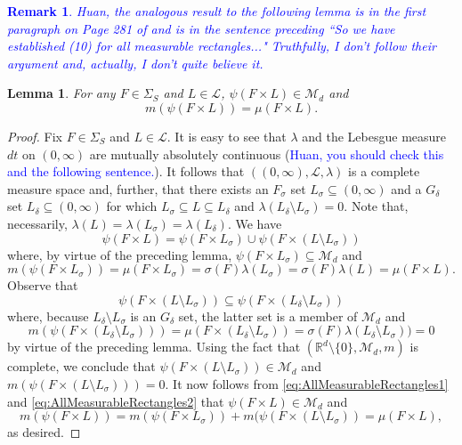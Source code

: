 \documentclass[11pt]{article}
\theoremstyle{theorem}
\newtheorem{lemma}[theorem]{Lemma}
\newtheorem{remark}{Remark}
\begin{document}
\textcolor{blue}{\begin{remark}
Huan, the analogous result to the following lemma is in the first paragraph on Page 281 of \cite{Stein2005} and is in the sentence preceding ``So we have established (10) for all measurable rectangles..." Truthfully, I don't follow their argument and, actually, I don't quite believe it. 
\end{remark}}
\begin{lemma}\label{lem:AllMeasurableRectangles} For any $F\in \Sigma_S$ and $L\in\mathcal{L}$, $\psi(F\times L)\in\mathcal{M}_d$ and 
\begin{equation*}
m(\psi(F\times L))=\mu(F\times L).
\end{equation*}
\end{lemma}
\begin{proof}
Fix $F\in\Sigma_S$ and $L\in\mathcal{L}$. It is easy to see that $\lambda$ and the Lebesgue measure $dt$ on $(0,\infty)$ are mutually absolutely continuous (\textcolor{blue}{Huan, you should check this and the following sentence.}). It follows that $((0,\infty), \mathcal{L},\lambda)$ is a complete measure space and, further, that there exists an $F_\sigma$ set $L_\sigma\subseteq (0,\infty)$ and a $G_\delta$ set $L_\delta\subseteq (0,\infty)$ for which $L_\sigma\subseteq L\subseteq L_\delta$ and $\lambda(L_\delta\setminus L_\sigma)=0$. Note that, necessarily, $\lambda(L)=\lambda(L_\sigma)=\lambda(L_\delta)$. We have
\begin{equation}\label{eq:AllMeasurableRectangles1}
\psi(F\times L)=\psi(F\times L_\sigma)\cup\psi(F\times (L\setminus L_\sigma))
\end{equation}
where, by virtue of the preceding lemma, $\psi(F\times L_\sigma)\subseteq \mathcal{M}_d$ and
\begin{equation}\label{eq:AllMeasurableRectangles2}
m(\psi(F\times L_{\sigma}))=\mu(F\times L_\sigma)=\sigma(F)\lambda(L_\sigma)=\sigma(F)\lambda(L)=\mu(F\times L).
\end{equation}
Observe that
\begin{equation*}
\psi(F\times (L\setminus L_\sigma))\subseteq \psi(F\times (L_{\delta}\setminus L_\sigma))
\end{equation*}
where, because $L_\delta\setminus L_\sigma$ is an $G_{\delta}$ set, the latter set is a member of $\mathcal{M}_d$ and
\begin{equation*}
m(\psi(F\times (L_\delta\setminus L_\sigma)))=\mu(F\times (L_\delta\setminus L_\sigma))=\sigma(F)\lambda(L_\delta\setminus L_\sigma))=0
\end{equation*}
by virtue of the preceding lemma. Using the fact that $(\mathbb{R}^d\setminus\{0\},\mathcal{M}_d,m)$ is complete, we conclude that $\psi(F\times (L\setminus L_\sigma))\in \mathcal{M}_d$ and $m(\psi(F\times (L\setminus L_\sigma)))=0$. It now follows from \eqref{eq:AllMeasurableRectangles1} and \eqref{eq:AllMeasurableRectangles2} that $\psi(F\times L)\in\mathcal{M}_d$ and
\begin{equation*}
m(\psi(F\times L))=m(\psi(F\times L_\sigma))+m(\psi(F\times (L\setminus L_\sigma))=\mu(F\times L),
\end{equation*}
as desired.
\end{proof}
\end{document}
